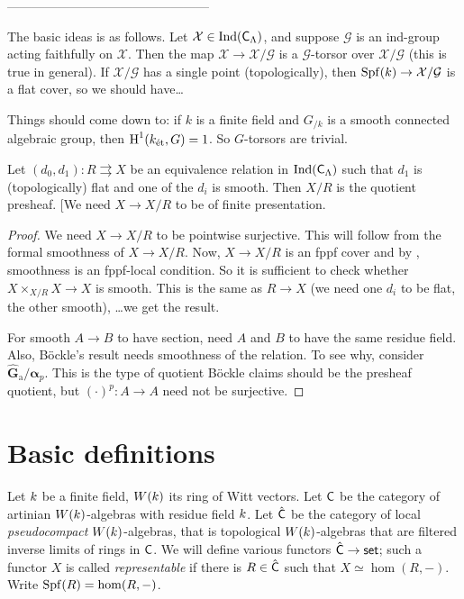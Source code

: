 \documentclass[phd,cornellheadings,draft]{cornell}
\begin{document}
------------------------------------------------

The basic ideas is as follows. Let $\mathcal X\in \operatorname{Ind}(\mathsf{C}_\Lambda)$, 
and suppose $\mathcal G$ is an ind-group acting faithfully on $\mathcal X$. Then 
the map $\mathcal X\to \mathcal X/\mathcal G$ is a $\mathcal G$-torsor over 
$\mathcal X/\mathcal G$ (this is true in general). If $\mathcal X/\mathcal G$ has a single 
point (topologically), then $\operatorname{Spf}(k) \to \mathcal X/\mathcal G$ is a 
flat cover, so we should have\ldots 

Things should come down to: if $k$ is a finite field and $G_{/k}$ is a smooth 
connected algebraic group, then $\operatorname{H}^1(k_\textnormal{\'et},G)=1$. So $G$-torsors 
are trivial. 

\begin{theorem}
Let $(d_0,d_1)\colon R\rightrightarrows X$ be an equivalence relation in 
$\operatorname{Ind}(\mathsf{C}_\Lambda)$ such that $d_1$ is (topologically) flat and 
one of the $d_i$ is smooth. Then $X/R$ is the quotient presheaf. [We need 
$X\to X/R$ to be of finite presentation. 
\end{theorem}
\begin{proof}
We need $X\to X/R$ to be pointwise surjective. This will follow from the formal 
smoothness of $X\to X/R$. Now, $X\to X/R$ is an fppf cover and by 
\cite[17.7.3(ii)]{ega4-4}, smoothness is an fppf-local condition. So it is 
sufficient to check whether $X\times_{X/R} X\to X$ is smooth. This is the same 
as $R\to X$ (we need one $d_i$ to be flat, the other smooth), \ldots we get the 
result. 

For smooth $A\to B$ to have section, need $A$ and $B$ to have the same residue 
field. Also, B\"ockle's result needs smoothness of the relation. To see why, 
consider $\hat{\mathbf{G}}_\mathrm{a}/\bm\alpha_p$. This is the type of quotient 
B\"ockle claims should be the presheaf quotient, but $(\cdot)^p\colon A\to A$ 
need not be surjective. 
\end{proof}





\section{Basic definitions}

Let $k$ be a finite field, $W(k)$ its ring of Witt vectors. 
Let $\mathsf{C}$ be the category of artinian $W(k)$-algebras with residue field $k$. 
Let $\hat{\mathsf{C}}$ be the category of local \emph{pseudocompact} $W(k)$-algebras, that is topological $W(k)$-algebras that are filtered inverse limits of rings in $\mathsf{C}$. 
We will define various functors $\hat{\mathsf{C}}\to \mathsf{set}$; such a functor $X$ is called \emph{representable} if there is $R\in \hat{\mathsf{C}}$ such that $X\simeq \hom(R,-)$. 
Write $\operatorname{Spf}(R)=\hom(R,-)$. 
\end{document}

